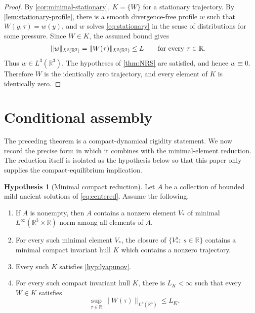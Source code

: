 \documentclass[11pt]{amsart}
\theoremstyle{plain}
\theoremstyle{definition}
\newtheorem{hypothesis}[theorem]{Hypothesis}
\theoremstyle{remark}
\numberwithin{equation}{section}
\begin{document}
\begin{proof}
By \cref{cor:minimal-stationary}, \(K=\{W\}\) for a stationary trajectory.
By \cref{lem:stationary-profile}, there is a smooth divergence-free profile
\(w\) such that \(W(y,\tau)=w(y)\), and \(w\) solves \eqref{eq:stationary} in
the sense of distributions for some pressure.  Since \(W\in K\), the assumed
bound gives
\[
   \|w\|_{L^3(\mathbb R^3)}
   =
   \|W(\tau)\|_{L^3(\mathbb R^3)}
   \le L
   \qquad\hbox{for every }\tau\in\mathbb R .
\]
Thus \(w\in L^3(\mathbb R^3)\).  The hypotheses of \cref{thm:NRS} are
satisfied, and hence \(w\equiv0\).  Therefore \(W\) is the identically zero
trajectory, and every element of \(K\) is identically zero.
\end{proof}

\section{Conditional assembly}

The preceding theorem is a compact-dynamical rigidity statement.  We now
record the precise form in which it combines with the minimal-element
reduction.  The reduction itself is isolated as the hypothesis below so that
this paper only supplies the compact-equilibrium implication.

\begin{hypothesis}[Minimal compact reduction]\label{hyp:minimal-compact}
Let \(A\) be a collection of bounded mild ancient solutions of
\eqref{eq:centered}.  Assume the following.

\begin{enumerate}
\item If \(A\) is nonempty, then \(A\) contains a nonzero element \(V_*\) of
minimal \(L^\infty(\mathbb R^3\times\mathbb R)\) norm among all elements of
\(A\).

\item For every such minimal element \(V_*\), the closure of
\(\{V_*^s:\ s\in\mathbb R\}\) contains a minimal compact invariant hull \(K\)
which contains a nonzero trajectory.

\item Every such \(K\) satisfies \cref{hyp:lyapunov}.

\item For every such compact invariant hull \(K\), there is \(L_K<\infty\)
such that every \(W\in K\) satisfies
\[
   \sup_{\tau\in\mathbb R}\|W(\tau)\|_{L^3(\mathbb R^3)}\le L_K .
\]
\end{enumerate}
\end{hypothesis}
\end{document}
